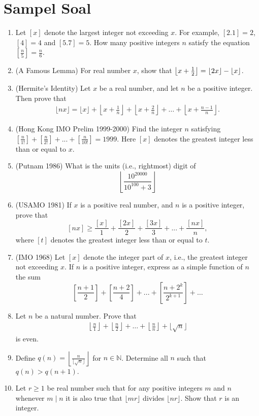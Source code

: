 \documentclass[11pt]{scrartcl}
\begin{document}
\section{Sampel Soal}
\begin{enumerate}
    \item Let $[x]$ denote the largest integer not exceeding $x$. For example, $[2.1]=2$, $[4]=4$ and $[5.7]=5$. How many positive integers $n$ satisfy the equation $\left[\frac{n}{5}\right]=\frac{n}{6}$.

    \item (A Famous Lemma) For real number $x$, show that $\left\lfloor x+\frac{1}{2} \right\rfloor = \left\lfloor 2x \right\rfloor-\left\lfloor x \right\rfloor$.

    \item (Hermite's Identity) Let $x$ be a real number, and let $n$ be a positive integer. Then prove that
    \begin{align*}
         \lfloor nx \rfloor = \lfloor x \rfloor + \left\lfloor x+\frac{1}{n} \right\rfloor + \left\lfloor x+\frac{2}{n} \right\rfloor + \dots + \left\lfloor x+\frac{n-1}{n} \right\rfloor.
    \end{align*}
    

    \item (Hong Kong IMO Prelim 1999-2000) Find the integer $n$ satisfying $\left[\frac{n}{1!}\right]+\left[\frac{n}{2!}\right]+...+\left[\frac{n}{10!}\right]=1999$. Here $[x]$ denotes the greatest integer less than or equal to $x$.

    \item (Putnam 1986) What is the units (i.e., rightmost) digit of
\[\left\lfloor \frac{10^{20000}}{10^{100}+3}\right\rfloor\]

    \item  (USAMO 1981) If $x$ is a positive real number, and $n$ is a positive integer, prove that
\[[nx] \geq \frac{[x]}{1} + \frac{[2x]}{2} + \frac{[3x]}{3} + ... + \frac{[nx]}{n},\]where $[t]$ denotes the greatest integer less than or equal to $t$.

    \item (IMO 1968) Let $[x]$ denote the integer part of $x$, i.e., the greatest integer not exceeding $x$. If $n$ is a positive integer, express as a simple function of $n$ the sum\[\left[\frac{n+1}{2}\right]+\left[\frac{n+2}{4}\right]+...+\left[\frac{n+2^k}{2^{k+1}}\right]+\ldots\]

    \item Let $n$ be a natural number. Prove that
    \begin{align*}
        \left\lfloor \frac{n}{1} \right\rfloor + \left\lfloor \frac{n}{2} \right\rfloor + \dots + \left\lfloor \frac{n}{n} \right\rfloor + \lfloor \sqrt{n} \rfloor
    \end{align*}
    is even.

    \item Define $q(n)=\left\lfloor\frac{n}{\lfloor\sqrt{n}\rfloor}\right\rfloor$ for $n \in \mathbb{N}$. Determine all $n$ such that $q(n)>q(n+1)$.

    \item Let $r \ge 1$ be real number such that for any positive integers $m$ and $n$ whenever $m \mid n$ it is also true that $\lfloor mr \rfloor$ divides $\lfloor nr \rfloor$. Show that $r$ is an integer.
\end{enumerate}
\end{document}
